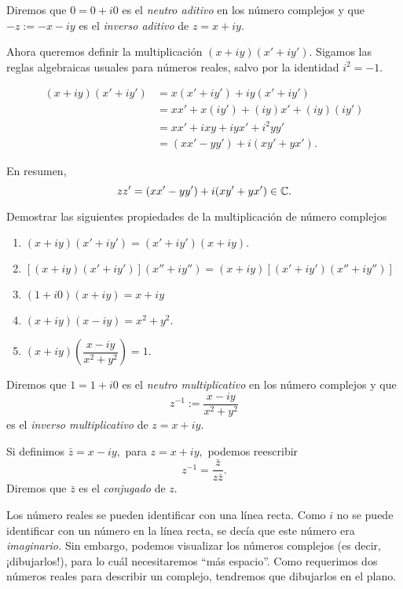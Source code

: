 Diremos que $0=0+i0$ es el \emph{neutro aditivo} en los número complejos y que $-z:=-x-iy$ es el \emph{inverso aditivo}
de $z=x+iy.$

Ahora queremos definir la multiplicación $(x+iy)(x'+iy').$ Sigamos las reglas algebraicas usuales para números reales,
salvo por la identidad $i^2=-1.$

\begin{align*}
(x+iy)(x'+iy')&= x(x'+iy')+iy(x'+iy')\\
&= xx'+x(iy')+(iy)x'+(iy)(iy') \\
&= xx' + ixy +iyx' + i^{2}yy' \\
&= (xx'-yy')+i(xy'+yx').
\end{align*}

En resumen,
 $$
zz'= (xx'-yy')+i(xy'+yx') \in \mathbb{C}.
 $$

\begin{problema}
Demostrar las siguientes propiedades de la multiplicación de número complejos
\begin{enumerate}
 \item $(x+iy)(x'+iy')=(x'+iy')(x+iy).$
 \item $\left[ (x+iy)(x'+iy') \right] (x''+iy'')= (x+iy)\left[ (x'+iy') (x''+iy'') \right]$
 \item $(1+i0)(x+iy)=x+iy$
 \item $(x+iy)(x-iy)=x^2+y^2.$
 \item $(x+iy)\left( \dfrac{x-iy}{x^2+y^2} \right)=1.$
\end{enumerate}
\end{problema}

Diremos que $1=1+i0$ es el \emph{neutro multiplicativo} en los número complejos y que $$
z^{-1}:=\dfrac{x-iy}{x^2+y^2} 
$$ es el \emph{inverso multiplicativo} de $z=x+iy.$

Si definimos $\bar{z}=x-iy,$ para $z=x+iy,$ podemos reescribir $$z^{-1}=\dfrac{\bar{z}}{z\bar{z}}.$$
Diremos que $\bar{z}$ es el \emph{conjugado} de $z.$

\begin{observacion}
Los número reales se pueden identificar con una línea recta. Como $i$ no se puede identificar con un número en la línea
recta, se decía que este número era \emph{imaginario.} Sin embargo, podemos visualizar los números complejos (es decir,
¡dibujarlos!), para lo cuál necesitaremos ``más espacio''. Como requerimos dos números reales para describir un
complejo, tendremos que dibujarlos en el plano.
\end{observacion}

